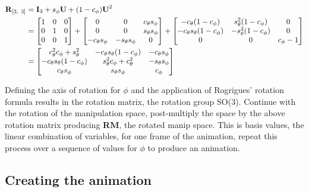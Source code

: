 \begin{align*}
    \textbf{R}_{[3,~3]} 
    &= \textbf{I}_3 + s_\phi\*\textbf{U} + (1-c_\phi)\*\textbf{U}^2 \\
        &=
    \begin{bmatrix}
      1&0&0 \\ 
      0&1&0 \\ 
      0&0&1 \\
    \end{bmatrix} +
    \begin{bmatrix}
      0 & 0 & c_\theta s_\phi \\
      0 & 0 & s_\theta s_\phi \\
      -c_\theta s_\phi & -s_\theta s_\phi & 0 \\
    \end{bmatrix} +
    \begin{bmatrix}
      -c_\theta (1-c_\phi) & s^2_\theta (1-c_\phi) & 0 \\
      -c_\theta s_\theta (1-c_\phi) & -s^2_\theta (1-c_\phi) & 0 \\
      0 & 0 & c_\phi-1 \\
    \end{bmatrix} \\
    &= 
    \begin{bmatrix}
      c_\theta^2 c_\phi + s_\theta^2 &
      -c_\theta s_\theta (1 - c_\phi) &
      -c_\theta s_\phi \\
      -c_\theta s_\theta (1 - c_\phi) &
      s_\theta^2 c_\phi + c_\theta^2 &
      -s_\theta s_\phi \\
      c_\theta s_\phi &
      s_\theta s_\phi &
      c_\phi
    \end{bmatrix} \\
\end{align*}

Defining the axis of rotation for \(\phi\) and the application of
Rogrigues' rotation formula results in the rotation matrix, the rotation
group SO(3). Continue with the rotation of the manipulation space,
post-multiply the space by the above rotation matrix producing
\textbf{RM}, the rotated manip space. This is basis values, the linear
combination of variables, for one frame of the animation, repeat this
process over a sequence of values for \(\phi\) to produce an animation.

\hypertarget{creating-the-animation}{%
\subsection{Creating the animation}\label{creating-the-animation}}

